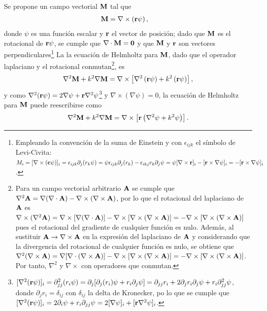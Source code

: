 Se propone un campo vectorial $\vb{M}$ tal que
	\begin{align}
	\vb{M} &= \nabla \times \left(\vb{r} \psi\right),
	\label{eq:MrotCPsi}
	\end{align}
donde $\psi$ es una función escalar y $\vb{r}$ el vector de posición; dado que $\vb{M}$ es el rotacional de  $\vb{r}\psi$, se cumple que $\nabla\cdot \vb{M} = \vb{0}$ y que $\vb{M}$ y $\vb{r}$ son vectores perpendiculares\footnote{Empleando la convención de la suma de Einstein y con $\epsilon_{ijk}$ el símbolo de  Levi-Civita: $M_i = [\nabla\times(\vb{c}\psi)]_i =  \epsilon_{ijk}\partial_j(r_k\psi) =\psi\epsilon_{ijk}\partial_j(r_k) -\epsilon_{ikj}r_k\partial_j\psi  =\psi[\nabla\times\vb{r}]_i - [\vb{r}\times\nabla\psi]_i = - [\vb{r}\times\nabla\psi]_i$.} La la ecuación de Helmholtz para $\vb{M}$, dado que el operador laplaciano y el rotacional conmutan\footnote{ Para un campo vectorial arbitrario $\vb{A}$ se cumple que $\nabla^2\vb{A} = \nabla(\nabla\cdot\vb{A}) - \nabla\times(\nabla\times\vb{A})$, por lo que el rotacional del laplaciano de $\vb{A}$ es $ \nabla\times( \nabla^2\vb{A})=\nabla\times[\nabla(\nabla\cdot\vb{A})  ]-  \nabla\times[\nabla\times(\nabla\times \vb{A})] = -  \nabla\times[\nabla\times(\nabla\times \vb{A})] $ pues el rotacional del gradiente de cualquier función es nulo. Además, al sustituir $\vb{A}\to \nabla\times\vb{A}$ en la expresión del laplaciano de $\vb{A}$ y  considerando que la divergencia del rotacional de cualquier función es nulo, se obtiene que$ \nabla^2(\nabla\times\vb{A})=\nabla[\nabla\cdot(\nabla\times\vb{A})  ]-  \nabla\times[\nabla\times(\nabla\times \vb{A})] = -  \nabla\times[\nabla\times(\nabla\times \vb{A})] $. Por tanto, $\nabla^2$ y $\nabla\times$ con operadores que conmutan.}, es
	\begin{align*}
	\nabla^2 \vb{M} + k^2 \nabla\vb{M} = \nabla\times \left[ \nabla^2\left(\vb{r} \psi\right)  
											+ k^2  \left(\vb{r} \psi\right) \right],
	\end{align*}
y como $\nabla^2 (\vb{r}\psi)=2\nabla\psi+\vb{r}\nabla^2\psi$\footnote{$[\nabla^2 (\vb{r}\psi)]_i = \partial^2_{jj}(r_i\psi)= \partial_j [\partial_j(r_i)\psi+r_i\partial_j\psi] =\partial_{jj}{r_i} + 2 \partial_jr_i\partial_j\psi+r_i\partial^2_{jj}\psi$, donde $\partial_j r_i = \delta_{ij}$ con $\delta_{ij}$ la delta de Kronecker, po lo que se cumple que $[\nabla^2 (\vb{r}\psi)]_i = 2\partial_i\psi+r_i\partial_{jj}\psi = 2[\nabla\psi]_i + [\vb{r}\nabla^2\psi]_i$.} y  $\nabla\times(\nabla \psi)=0$, la ecuación de Helmholtz para $\vb{M}$ puede reescribirse como
	\begin{align}
	\nabla^2 \vb{M} + k^2 \nabla\vb{M}  = \nabla\times\left[\vb{r}\left( \nabla^2\psi+k^2\psi \right) \right].
	\end{align}
